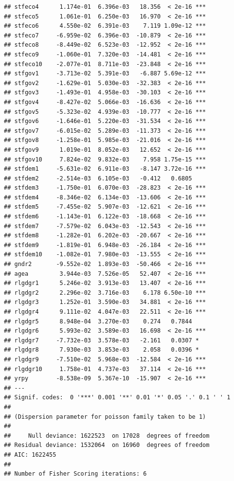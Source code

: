 \documentclass[
]{article}
\begin{document}
\begin{verbatim}
## stfeco4      1.174e-01  6.396e-03   18.356  < 2e-16 ***
## stfeco5      1.061e-01  6.250e-03   16.970  < 2e-16 ***
## stfeco6      4.550e-02  6.391e-03    7.119 1.09e-12 ***
## stfeco7     -6.959e-02  6.396e-03  -10.879  < 2e-16 ***
## stfeco8     -8.449e-02  6.523e-03  -12.952  < 2e-16 ***
## stfeco9     -1.060e-01  7.320e-03  -14.481  < 2e-16 ***
## stfeco10    -2.077e-01  8.711e-03  -23.848  < 2e-16 ***
## stfgov1     -3.713e-02  5.391e-03   -6.887 5.69e-12 ***
## stfgov2     -1.629e-01  5.030e-03  -32.383  < 2e-16 ***
## stfgov3     -1.493e-01  4.958e-03  -30.103  < 2e-16 ***
## stfgov4     -8.427e-02  5.066e-03  -16.636  < 2e-16 ***
## stfgov5     -5.323e-02  4.939e-03  -10.777  < 2e-16 ***
## stfgov6     -1.646e-01  5.220e-03  -31.534  < 2e-16 ***
## stfgov7     -6.015e-02  5.289e-03  -11.373  < 2e-16 ***
## stfgov8     -1.258e-01  5.985e-03  -21.016  < 2e-16 ***
## stfgov9      1.019e-01  8.052e-03   12.652  < 2e-16 ***
## stfgov10     7.824e-02  9.832e-03    7.958 1.75e-15 ***
## stfdem1     -5.631e-02  6.911e-03   -8.147 3.72e-16 ***
## stfdem2     -2.514e-03  6.105e-03   -0.412   0.6805    
## stfdem3     -1.750e-01  6.070e-03  -28.823  < 2e-16 ***
## stfdem4     -8.346e-02  6.134e-03  -13.606  < 2e-16 ***
## stfdem5     -7.455e-02  5.907e-03  -12.621  < 2e-16 ***
## stfdem6     -1.143e-01  6.122e-03  -18.668  < 2e-16 ***
## stfdem7     -7.579e-02  6.043e-03  -12.543  < 2e-16 ***
## stfdem8     -1.282e-01  6.202e-03  -20.667  < 2e-16 ***
## stfdem9     -1.819e-01  6.948e-03  -26.184  < 2e-16 ***
## stfdem10    -1.082e-01  7.980e-03  -13.555  < 2e-16 ***
## gndr2       -9.552e-02  1.893e-03  -50.466  < 2e-16 ***
## agea         3.944e-03  7.526e-05   52.407  < 2e-16 ***
## rlgdgr1      5.246e-02  3.913e-03   13.407  < 2e-16 ***
## rlgdgr2      2.296e-02  3.716e-03    6.178 6.50e-10 ***
## rlgdgr3      1.252e-01  3.590e-03   34.881  < 2e-16 ***
## rlgdgr4      9.111e-02  4.047e-03   22.511  < 2e-16 ***
## rlgdgr5      8.948e-04  3.270e-03    0.274   0.7844    
## rlgdgr6      5.993e-02  3.589e-03   16.698  < 2e-16 ***
## rlgdgr7     -7.732e-03  3.578e-03   -2.161   0.0307 *  
## rlgdgr8      7.930e-03  3.853e-03    2.058   0.0396 *  
## rlgdgr9     -7.510e-02  5.968e-03  -12.584  < 2e-16 ***
## rlgdgr10     1.758e-01  4.737e-03   37.114  < 2e-16 ***
## yrpy        -8.538e-09  5.367e-10  -15.907  < 2e-16 ***
## ---
## Signif. codes:  0 '***' 0.001 '**' 0.01 '*' 0.05 '.' 0.1 ' ' 1
## 
## (Dispersion parameter for poisson family taken to be 1)
## 
##     Null deviance: 1622523  on 17028  degrees of freedom
## Residual deviance: 1532064  on 16960  degrees of freedom
## AIC: 1622455
## 
## Number of Fisher Scoring iterations: 6
\end{verbatim}
\end{document}
